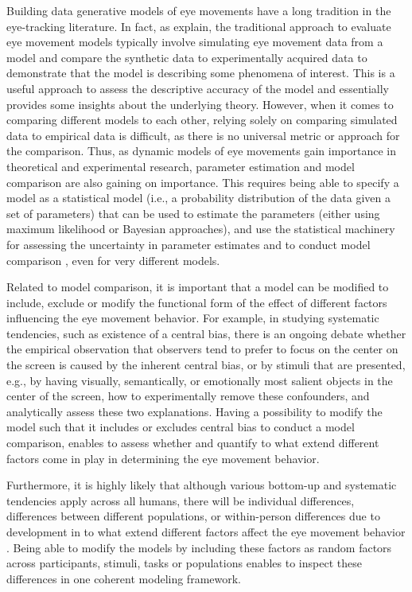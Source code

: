 \documentclass{article}
\begin{document}
Building data generative models of eye movements have a long tradition in the eye-tracking literature. In fact, as \citet{schutt2017likelihood} explain, the traditional approach to evaluate eye movement models typically involve simulating eye movement data from a model and compare the synthetic data to experimentally acquired data to demonstrate that the model is describing some phenomena of interest. This is a useful approach to assess the descriptive accuracy of the model and essentially provides some insights about the underlying theory. However, when it comes to comparing different models to each other, relying solely on comparing simulated data to empirical data is difficult, as there is no universal metric or approach for the comparison. Thus, as dynamic models of eye movements gain importance in theoretical and experimental research, parameter estimation and model comparison are also gaining on importance. This requires being able to specify a model as a statistical model (i.e., a probability distribution of the data given a set of parameters) that can be used to estimate the parameters (either using maximum likelihood or Bayesian approaches), and use the statistical machinery for assessing the uncertainty in parameter estimates and to conduct model comparison \citep{schutt2017likelihood,malem2020exploration}, even for very different models.

Related to model comparison, it is important that a model can be modified to include, exclude or modify the functional form of the effect of different factors influencing the eye movement behavior. For example, in studying systematic tendencies, such as existence of a central bias, there is an ongoing debate whether the empirical observation that observers tend to prefer to focus on the center on the screen is caused by the inherent central bias, or by stimuli that are presented, e.g., by having visually, semantically, or emotionally most salient objects in the center of the screen, how to experimentally remove these confounders, and analytically assess these two explanations. Having a possibility to modify the model such that it includes or excludes central bias to conduct a model comparison, enables to assess whether and quantify to what extend different factors come in play in determining the eye movement behavior. 

Furthermore, it is highly likely that although various bottom-up and systematic tendencies apply across all humans, there will be individual differences, differences between different populations, or within-person differences due to development in to what extend different factors affect the eye movement behavior \citep{de2019individual}. Being able to modify the models by including these factors as random factors across participants, stimuli, tasks or populations enables to inspect these differences in one coherent modeling framework.
\end{document}
